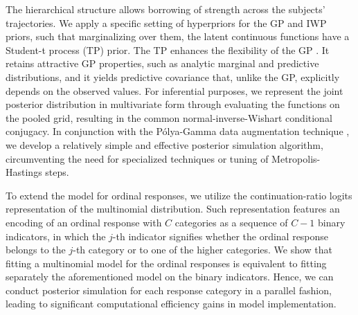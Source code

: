 The hierarchical structure allows borrowing of strength across the subjects' trajectories. 
We apply a specific setting of hyperpriors for the GP and IWP priors, such that marginalizing 
over them, the latent continuous functions have a Student-t process (TP) prior. The 
TP enhances the flexibility of the GP \citep[e.g.,][]{Shah2014}. It retains attractive GP 
properties, such as analytic marginal and predictive distributions, and it yields 
predictive covariance that, unlike the GP, explicitly depends on the observed values. 
For inferential purposes, we represent the joint posterior distribution in multivariate form 
through evaluating the functions on the pooled grid, resulting in the common 
normal-inverse-Wishart conditional conjugacy. In conjunction with the Pólya-Gamma data 
augmentation technique \citep{Polson2013}, we develop a relatively simple and effective posterior 
simulation algorithm, circumventing the need for specialized techniques or tuning of 
Metropolis-Hastings steps. 


To extend the model for ordinal responses, we utilize the continuation-ratio logits 
representation of the multinomial distribution. Such representation features an %
encoding of an ordinal response with $C$ categories as a sequence of $C-1$ binary 
indicators, in which the $j$-th indicator signifies whether the ordinal response belongs 
to the $j$-th category or to one of the higher categories. 
We show that fitting a multinomial model for the ordinal responses is equivalent 
to fitting separately the aforementioned model on the binary indicators. 
Hence, we can conduct posterior simulation for each response category in a parallel fashion, 
leading to significant computational efficiency gains in model implementation.       


